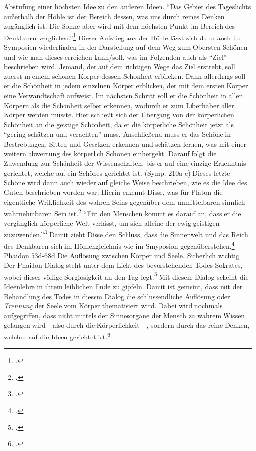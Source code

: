 Abstufung einer höchsten Idee zu den anderen Ideen.
\enquote{Das Gebiet des Tageslichts außerhalb der Höhle ist der Bereich dessen, was uns durch reines Denken zugänglich ist. Die Sonne aber wird mit dem höchsten Punkt im Bereich des Denkbaren verglichen.}\footcite[][S. 49]{DisseMetaphysik}
Dieser Aufstieg aus der Höhle lässt sich dann auch im Symposion wiederfinden in der Darstellung auf dem Weg zum Obersten Schönen und wie man dieses erreichen kann/soll, was im Folgenden auch als \enquote{Ziel} beschrieben wird.
Jemand, der auf dem richtigen Wege das Ziel erstrebt, soll zuerst in einem schönen Körper dessen Schönheit erblicken. Dann allerdings soll er die Schönheit in jedem einzelnen Körper erblicken, der mit dem ersten Körper eine Verwandtschaft aufweist. Im nächsten Schritt soll er die Schönheit in allen Körpern als die Schönheit selber erkennen, wodurch er zum Liberhaber aller Körper werden müsste. Hier schließt sich der Übergang von der körperlichen Schönheit an die geistige Schönheit, da er die körperliche Schönheit jetzt als \enquote{gering schätzen und verachten} muss. Anschließend muss er das Schöne in Bestrebungen, Sitten und Gesetzen erkennen und schätzen lernen, was mit einer weitern abwertung des körperlich Schönen einhergeht. Darauf folgt die Zuwendung zur Schönheit der Wissenschaften, bis er auf eine einzige Erkenntnis gerichtet, welche auf ein Schönes gerichtet ist. (Symp. 210a-e)
Dieses letzte Schöne wird dann auch wieder auf gleiche Weise beschrieben, wie es die Idee des Guten beschrieben worden war: 
Hierin erkennt Disse, was für Platon die eigentliche Wriklichkeit des wahren Seins gegenüber dem unmittelbaren sinnlich wahrnehmbaren Sein ist.\footcite[vgl.][S. 27]{DisseMetaphysik}
\enquote{Für den Menschen kommt es darauf an, dass er die vergänglich-körperliche Welt verlässt, um sich alleine der ewig-geistigen zuzuwenden.}\footcite[][S. 28]{DisseMetaphysik}
Damit zieht Disse den Schluss, dass die Sinnenwelt und das Reich des Denkbaren sich im Höhlengleichnis wie im Smyposion gegenüberstehen.\footcite[vgl.][S. 28]{DisseMetaphysik}
Phaidon 63d-68d
Die Auflösung zwischen Körper und Seele. Sicherlich wichtig
Der Phaidon Dialog steht unter dem Licht des bevorstehenden Todes Sokrates, wobei dieser völlige Sorglosigkeit an den Tag legt.\footcite[vgl.][S. 28]{DisseMetaphysik}
Mit diesem Dialog scheint die Ideenlehre in ihrem leiblichen Ende zu gipfeln. Damit ist gemeint, dass mit der Behandlung des Todes in diesem Dialog die schlussendliche Auflösung oder \emph{Trennung} der Seele vom Körper thematisiert wird. Dabei wird nochmals aufgegriffen, dass nicht mittels der Sinnesorgane der Mensch zu wahrem Wissen gelangen wird - also durch die Körperlichkeit - , sondern durch das reine Denken, welches auf die Ideen gerichtet ist.\footcite[vgl.][S. 29]{DisseMetaphysik} 

